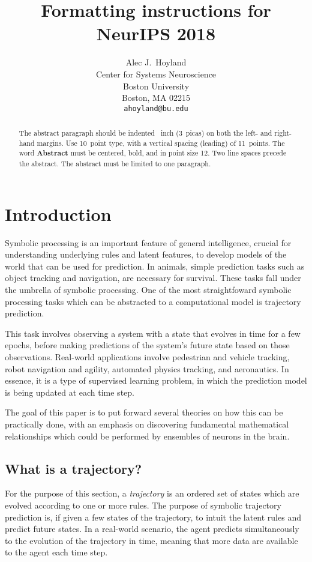 \documentclass{article}
\title{Formatting instructions for NeurIPS 2018}
\author{%
  Alec J.~Hoyland \\
  Center for Systems Neuroscience\\
  Boston University\\
  Boston, MA 02215 \\
  \texttt{ahoyland@bu.edu} \\
}
\begin{document}
\maketitle

\begin{abstract}
  The abstract paragraph should be indented ~inch (3~picas) on
  both the left- and right-hand margins. Use 10~point type, with a vertical
  spacing (leading) of 11~points.  The word \textbf{Abstract} must be centered,
  bold, and in point size 12. Two line spaces precede the abstract. The abstract
  must be limited to one paragraph.
\end{abstract}

\section{Introduction}

Symbolic processing is an important feature of general intelligence,
crucial for understanding underlying rules and latent features,
to develop models of the world that can be used for prediction.
In animals, simple prediction tasks such as object tracking and navigation,
are necessary for survival.
These tasks fall under the umbrella of symbolic processing.
One of the most straightfoward symbolic processing tasks
which can be abstracted to a computational model is trajectory prediction.

This task involves observing a system with a state that evolves in time
for a few epochs, before making predictions of the system's future state
based on those observations.
Real-world applications involve pedestrian and vehicle tracking,
robot navigation and agility, automated physics tracking,
and aeronautics.
In essence, it is a type of supervised learning problem,
in which the prediction model is being updated at each time step.

The goal of this paper is to put forward several theories on how this can be practically done,
with an emphasis on discovering fundamental mathematical relationships
which could be performed by ensembles of neurons in the brain.

\subsection{What is a trajectory?}

For the purpose of this section, a \textit{trajectory} is an ordered set of states
which are evolved according to one or more rules.
The purpose of symbolic trajectory prediction is, if given a few states of the trajectory,
to intuit the latent rules and predict future states.
In a real-world scenario, the agent predicts simultaneously to the evolution of the trajectory in time,
meaning that more data are available to the agent each time step.
\end{document}
